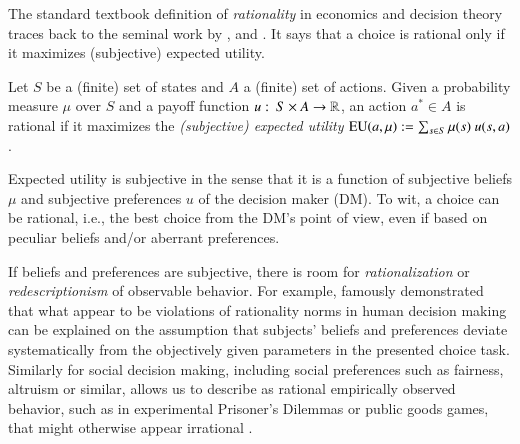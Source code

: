 \documentclass[fleqn,reqno,11pt]{article}
\begin{document}
The standard textbook definition of \textit{rationality} in economics and decision theory
traces back to the seminal work by \citet{deFinetti37}, \citet{Neumannvon-NeumannMorgenstern1944:Theory-of-Games}
and \citet{Savage1954:The-Foundations}. It says that a choice is rational only if it maximizes
(subjective) expected utility.

\begin{definition}
  \label{def:rationality}
  Let $S$ be a (finite) set of states and $A$ a (finite) set of actions. Given a
  probability measure $\mu$ over $S$ and a payoff function
  $u \thinspace \colon \thinspace S \times A \rightarrow \mathbb{R} $, an action $a^* \in A$ is rational
  if it maximizes the \emph{(subjective) expected utility}
  $\operatorname{EU}(a, \mu) := \sum_{s \in S} \mu(s) \ u(s, a)$.
\end{definition}

\noindent Expected utility is subjective in the sense that it is a function of subjective
beliefs $\mu$ and subjective preferences $u$ of the decision maker (DM). To wit, a choice can be
rational, i.e., the best choice from the DM's point of view, even if based on peculiar beliefs
and/or aberrant preferences. %

If beliefs and preferences are subjective, there is room for \emph{rationalization} or
\emph{redescriptionism} of observable behavior. For example,
\citet{KahnemannTversky1979:Prospect-Theory} famously demonstrated that what appear to be
violations of rationality norms in human decision making can be explained on the assumption
that subjects' beliefs and preferences deviate systematically from the objectively given
parameters in the presented choice task. Similarly for social decision making, including social
preferences such as fairness, altruism or similar, allows us to describe as rational
empirically observed behavior, such as in experimental Prisoner's Dilemmas or public goods
games, that might otherwise appear irrational \citep[e.g.,][]{fehrschmidt99,charrab02}.
\end{document}

